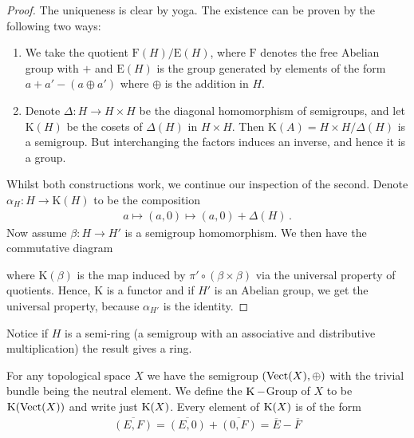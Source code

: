 \begin{proof}
	The uniqueness is clear by yoga. The existence can be proven by the following two ways:
	\begin{enumerate}
		\item We take the quotient $\mathrm{F}(H)\slash \mathrm{E}(H)$, where $\mathrm{F}$ denotes the free Abelian group with $+$ and $\mathrm{E}(H)$ is the group generated by elements of the form $a+a'-(a\oplus a')$ where $\oplus$ is the addition in $H$.
		\item Denote $\Delta: H \to H\times H$ be the diagonal homomorphism of semigroups, and let $\mathrm{K}(H)$ be the cosets of $\Delta(H)$ in $H\times H$. Then $\mathrm{K}(A)=H\times H\slash \Delta(H)$ is a semigroup. But interchanging the factors induces an inverse, and hence it is a group.  
	\end{enumerate}
	Whilst both constructions work, we continue our inspection of the second. Denote $\alpha_H:H \to \mathrm{K}(H)$ to be the composition 
	\begin{align*}
		a\mapsto (a,0)\mapsto (a,0)+\Delta(H)\, .
	\end{align*} Now assume $\beta:H\to H'$ is a semigroup homomorphism. We then have the commutative diagram 
	\begin{center}
	\end{center} where $\mathrm{K}(\beta)$ is the map induced by $\pi'\circ(\beta\times \beta)$ via the universal property of quotients. Hence, $\mathrm{K}$ is a functor and if $H'$ is an Abelian group, we get the universal property, because $\alpha_{H'}$ is the identity.
\end{proof}
\begin{remark}
	Notice if $H$ is a semi-ring (a semigroup with an associative and distributive multiplication) the result gives a ring.
\end{remark}
\begin{definition}[K-Group]
	For any topological space $X$ we have the semigroup $(\operatorname{\mathrm{Vect}}(X),\oplus)$ with the trivial bundle being the neutral element. We define the $\operatorname{\mathrm{K}}-$Group of $X$ to be $\operatorname{\mathrm{K}}(\operatorname{\mathrm{Vect}}(X))$ and write just $\operatorname{\mathrm{K}}(X)$. Every element of $\operatorname{\mathrm{K}}(X)$ is of the form 
	\begin{align*}
		\overline{(E,F)}=\overline{(E,0)}+\overline{(0,F)}= \overline{E}-\overline{F}
	\end{align*}
\end{definition}
